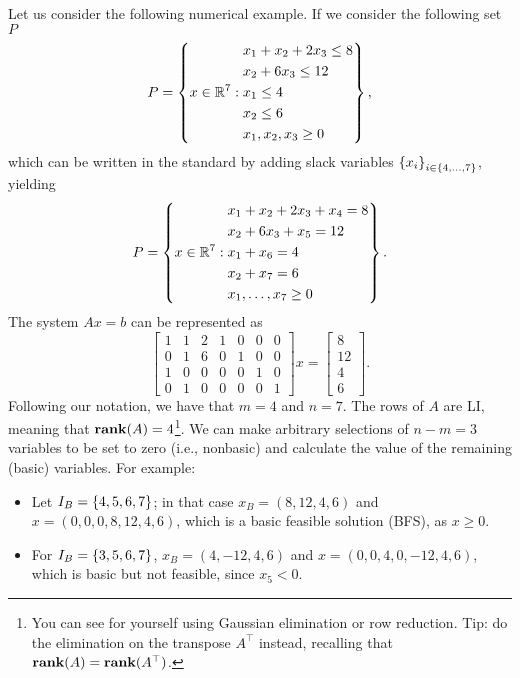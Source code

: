 Let us consider the following numerical example. If we consider the following set $P$
%
\begin{equation}  \label{p1c3:eq:example_P}
	P = \left\{x \in \mathbb{R}^7 :  
		\begin{aligned}
			& x_1 + x_2 + 2x_3 \le 8 \\
			& x_2 + 6 x_3 \le 12 \\
			& x_1 \le 4 \\
			& x_2 \le 6 \\
			& x_1, x_2, x_3 \ge 0
		\end{aligned}
		\right\}, 	
\end{equation}
%
which can be written in the standard by adding slack variables $\left\{ x_i \right \}_{i \in \{4,\dots,7\}}$, yielding 
%
\begin{equation}  \label{p1c3:eq:example_P}
	P = \left\{x \in \mathbb{R}^7 :  
		\begin{aligned}
			& x_1 + x_2 + 2x_3 + x_4 = 8 \\
			& x_2 + 6 x_3 + x_5 = 12 \\
			& x_1 + x_6 = 4 \\
			& x_2 + x_7 =6 \\
			& x_1, \dots, x_7 \ge 0
		\end{aligned}
		\right\}. 	
\end{equation}
%
The system $Ax=b$ can be represented as 
%  
\begin{equation*}
	\begin{bmatrix}
		1 & 1 & 2 & 1 & 0 & 0 & 0 \\
		0 & 1 & 6 & 0 & 1 & 0 & 0 \\
		1 & 0 & 0 & 0 & 0 & 1 & 0 \\
		0 & 1 & 0 & 0 & 0 & 0 & 1
	\end{bmatrix} x =
	\begin{bmatrix}
		8  \\
		12 \\
		4  \\
		6   	
	\end{bmatrix}.
\end{equation*}
%
Following our notation, we have that $m = 4$ and $n = 7$. The rows of $A$ are LI, meaning that $\mathop{\bf rank}(A) = 4$\footnote{You can see for yourself using Gaussian elimination or row reduction. Tip: do the elimination on the transpose $A^\top$ instead, recalling that $\mathop{\bf rank}(A) = \mathop{\bf rank}(A^\top)$.}. We can make arbitrary selections of $n-m = 3$ variables to be set to zero (i.e., nonbasic) and calculate the value of the remaining (basic) variables. For example:
\begin{itemize}
	\item Let $I_B = \left\{ 4, 5, 6, 7 \right \}$; in that case $x_B = (8,12,4,6)$ and $x = (0,0,0,8,12,4,6)$, which is a basic feasible solution (BFS), as $x \geq 0$.
	\item For $I_B = \left\{ 3,5,6,7 \right \}$, $x_B = (4,-12,4,6)$ and $x = (0, 0, 4, 0, -12, 4, 6)$, which is basic but not feasible, since $x_5 < 0$.	
\end{itemize}


